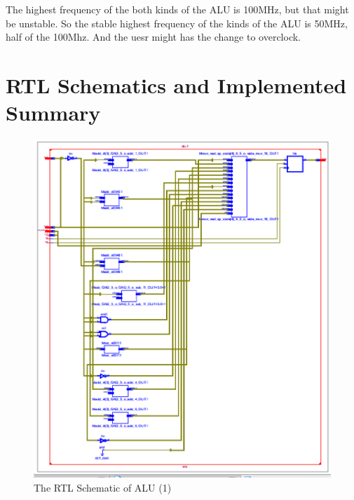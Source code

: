 \documentclass{article}
\begin{document}
      The highest frequency of the both kinds of the ALU is 100MHz, but that might be unstable.
      So the stable highest frequency of the kinds of the ALU is 50MHz, half of the 100Mhz.
      And the uesr might has the change to overclock.

      \section{RTL Schematics and Implemented Summary}
      \label{sec:rsnis}

\begin{figure}
\centering
\includegraphics[width=1\linewidth]{homework6-8}
\caption{The RTL Schematic of ALU (1)}
\label{fig:homework6-8}
\end{figure}
\end{document}
